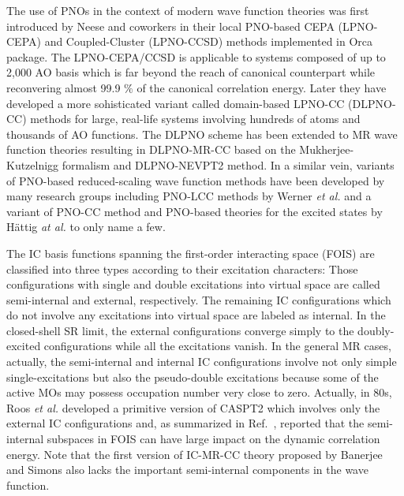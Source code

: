 \documentclass[aip,jcp,amsmath]{revtex4-1}
\begin{document}
%
The use of PNOs in the context of modern wave function theories was first introduced by Neese and coworkers in their local PNO-based CEPA (LPNO-CEPA)\cite{neeseefficient2009cepa} and Coupled-Cluster (LPNO-CCSD)\cite{neeseefficient2009,hansenefficient2011,doi:10.1021/ct100445s} methods implemented in Orca package.\cite{WCMS:WCMS1327}
%
The LPNO-CEPA/CCSD is applicable to systems composed of up to 2,000 AO basis which is far beyond the reach of canonical counterpart while reconvering almost 99.9 $\%$ of the canonical correlation energy.
%
Later they have developed a more sohisticated variant called domain-based LPNO-CC (DLPNO-CC) methods for large, real-life systems involving hundreds of atoms and thousands of AO functions.\cite{riplingeran2013,riplingernatural2013,pinskisparse2015,riplingersparse2016,doi:10.1063/1.4981521,dipayan2016}
%
The DLPNO scheme has been extended to MR wave function theories resulting in DLPNO-MR-CC based on the Mukherjee-Kutzelnigg formalism\cite{doi:10.1021/acs.jctc.5b00334,doi:10.1021/acs.jctc.7b01184,C8CP03577F} and DLPNO-NEVPT2\cite{:/content/aip/journal/jcp/144/9/10.1063/1.4942769} method.
%
In a similar vein, variants of PNO-based reduced-scaling wave function methods have been developed by many research groups including PNO-LCC methods by Werner {\it et al.}\cite{doi:10.1021/ct500725e,wernersdecay,doi:10.1021/acs.jctc.7b00554,publ7820099,publ8744633,publ9370681,publ9337428} and a variant of PNO-CC method and PNO-based theories for the excited states by H\"attig {\it at al.}\cite{doi:10.1080/00268976.2013.794314,doi:10.1080/00268976.2016.1263762,doi:10.1063/1.4972001,QUA:QUA24098,C4CP03502J,:/content/aip/journal/jcp/135/7/10.1063/1.3624370,:/content/aip/journal/jcp/135/21/10.1063/1.3664902,:/content/aip/journal/jcp/136/20/10.1063/1.4719981,:/content/aip/journal/jcp/139/8/10.1063/1.4819071} to only name a few.

%
The IC basis functions spanning the first-order interacting space (FOIS) are classified into three types according to their excitation characters:
%
Those configurations with single and double excitations into virtual space are called semi-internal and external, respectively.
%
The remaining IC configurations which do not involve any excitations into virtual space are labeled as internal.
%
In the closed-shell SR limit, the external configurations converge simply to the doubly-excited configurations while all the excitations vanish.
%
In the general MR cases, actually, the semi-internal and internal IC configurations involve not only simple single-excitations but also the pseudo-double excitations because some of the active MOs may possess occupation number very close to zero.
%
Actually, in 80s, Roos {\it et al.} developed a primitive version of CASPT2 which involves only the external IC configurations\cite{ROOS1982197} and, as summarized in Ref.~, reported that the semi-internal subspaces in FOIS can have large impact on the dynamic correlation energy.
%
Note that the first version of IC-MR-CC theory proposed by Banerjee and Simons also lacks the important semi-internal components in the wave function.\cite{simons1981}
\end{document}
